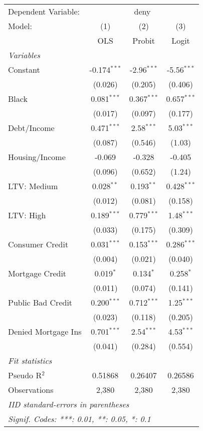 \begingroup
\centering
\begin{tabular}{lccc}
   \tabularnewline \midrule \midrule
   Dependent Variable: & \multicolumn{3}{c}{deny}\\
   Model:              & (1)            & (2)           & (3)\\  
                       &  OLS           & Probit        & Logit\\  
   \midrule
   \emph{Variables}\\
   Constant            & -0.174$^{***}$ & -2.96$^{***}$ & -5.56$^{***}$\\   
                       & (0.026)        & (0.205)       & (0.406)\\   
   Black               & 0.081$^{***}$  & 0.367$^{***}$ & 0.657$^{***}$\\   
                       & (0.017)        & (0.097)       & (0.177)\\   
   Debt/Income         & 0.471$^{***}$  & 2.58$^{***}$  & 5.03$^{***}$\\   
                       & (0.087)        & (0.546)       & (1.03)\\   
   Housing/Income      & -0.069         & -0.328        & -0.405\\   
                       & (0.096)        & (0.652)       & (1.24)\\   
   LTV: Medium         & 0.028$^{**}$   & 0.193$^{**}$  & 0.428$^{***}$\\   
                       & (0.012)        & (0.081)       & (0.158)\\   
   LTV: High           & 0.189$^{***}$  & 0.779$^{***}$ & 1.48$^{***}$\\   
                       & (0.033)        & (0.175)       & (0.309)\\   
   Consumer Credit     & 0.031$^{***}$  & 0.153$^{***}$ & 0.286$^{***}$\\   
                       & (0.004)        & (0.021)       & (0.040)\\   
   Mortgage Credit     & 0.019$^{*}$    & 0.134$^{*}$   & 0.258$^{*}$\\   
                       & (0.011)        & (0.074)       & (0.141)\\   
   Public Bad Credit   & 0.200$^{***}$  & 0.712$^{***}$ & 1.25$^{***}$\\   
                       & (0.023)        & (0.118)       & (0.205)\\   
   Denied Mortgage Ins & 0.701$^{***}$  & 2.54$^{***}$  & 4.53$^{***}$\\   
                       & (0.041)        & (0.284)       & (0.554)\\   
   \midrule
   \emph{Fit statistics}\\
   Pseudo R$^2$        & 0.51868        & 0.26407       & 0.26586\\  
   Observations        & 2,380          & 2,380         & 2,380\\  
   \midrule \midrule
   \multicolumn{4}{l}{\emph{IID standard-errors in parentheses}}\\
   \multicolumn{4}{l}{\emph{Signif. Codes: ***: 0.01, **: 0.05, *: 0.1}}\\
\end{tabular}
\par\endgroup
